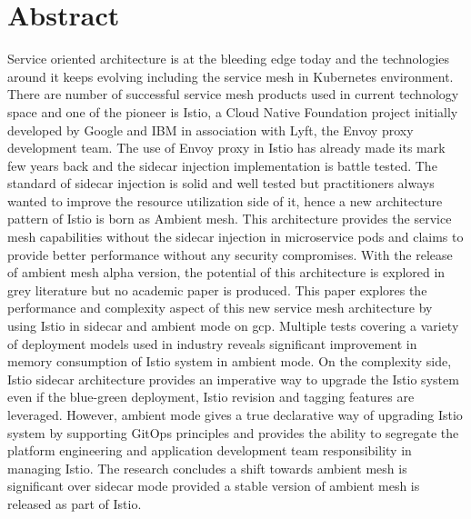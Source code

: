 \section*{Abstract}
Service oriented architecture is at the bleeding edge today and the technologies around it keeps evolving including the service mesh in Kubernetes environment. There are number of successful service mesh products used in current technology space and one of the pioneer is Istio, a Cloud Native Foundation project initially developed by Google and IBM in association with Lyft, the Envoy proxy development team. The use of Envoy proxy in Istio has already made its mark few years back and the sidecar injection implementation is battle tested. The standard of sidecar injection is solid and well tested but practitioners always wanted to improve the resource utilization side of it, hence a new architecture pattern of Istio is born as Ambient mesh. This architecture provides the service mesh capabilities without the sidecar injection in microservice pods and claims to provide better performance without any security compromises. With the release of ambient mesh alpha version, the potential of this architecture is explored in grey literature but no academic paper is produced. This paper explores the performance and complexity aspect of this new service mesh architecture by using Istio in sidecar and ambient mode on \acrfull{gcp}. Multiple tests covering a variety of deployment models used in industry reveals significant improvement in memory consumption of Istio system in ambient mode. On the complexity side, Istio sidecar architecture provides an imperative way to upgrade the Istio system even if the blue-green deployment, Istio revision and tagging features are leveraged. However, ambient mode gives a true declarative way of upgrading Istio system by supporting GitOps principles and provides the ability to segregate the platform engineering and application development team responsibility in managing Istio. The research concludes a shift towards ambient mesh is significant over sidecar mode provided a stable version of ambient mesh is released as part of Istio.